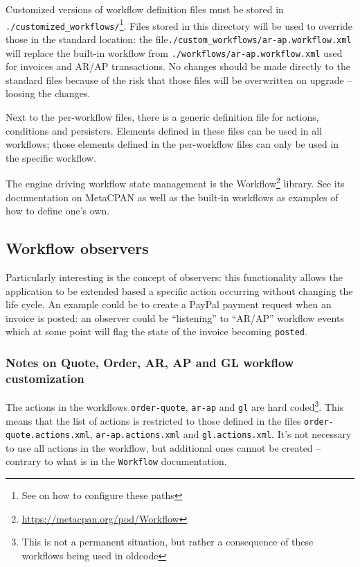 Customized versions of workflow definition files must be stored in \linebreak
 \texttt{./customized\_workflows/}\footnote{See
 	 on how to configure
 these paths}.  Files stored in this directory will be used to override those in
the standard location: the file\linebreak \texttt{./custom\_workflows/ar-ap.workflow.xml} will replace the built-in workflow
from \texttt{./workflows/ar-ap.workflow.xml} used for invoices and \linebreak AR/AP transactions.
No changes should be made directly to the standard files because of the risk that those
files will be overwritten on upgrade -- loosing the changes.

Next to the per-workflow files, there is a generic definition file for actions,
conditions and persisters.  Elements defined in these files can be used in all
workflows; those elements defined in the per-workflow files can only be used
in the specific workflow.

The engine driving workflow state management is the
Workflow\footnote{\url{https://metacpan.org/pod/Workflow}} library.  See its
documentation on MetaCPAN as well as the built-in workflows as examples of how
to define one's own.

\subsection{Workflow observers}
\label{subsec-customization-workflow-observers}

Particularly interesting is the concept of observers:
this functionality allows the application to be extended based a specific action
occurring without changing the life cycle.  An example could be to create a PayPal
payment request when an invoice is posted: an observer could be ``listening'' to
``AR/AP'' workflow events which at some point will flag the state of the invoice
becoming \texttt{posted}.

\subsubsection{Notes on Quote, Order, AR, AP and GL workflow customization}
\label{subsubsec-customization-workflow-observers-notes}

The actions in the workflows \texttt{order-quote}, \texttt{ar-ap} and \texttt{gl} are
hard coded\footnote{This is not a permanent situation, but rather a consequence of
these workflows being used in \gls{oldcode}}.  This means that the list of actions is restricted to those defined in the
files \texttt{order-quote.actions.xml}, \texttt{ar-ap.actions.xml} and
\texttt{gl.actions.xml}.  It's not necessary to use all actions in the workflow, but
additional ones cannot be created -- contrary to what is in the \texttt{Workflow}
documentation.

